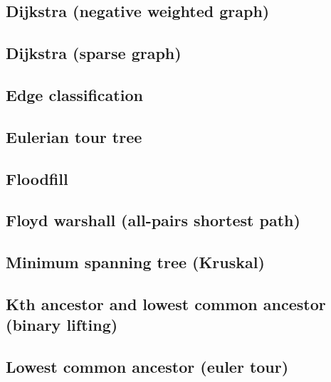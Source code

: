 \subsection{Dijkstra (negative weighted graph)}
\raggedbottom
\hrulefill
\subsection{Dijkstra (sparse graph)}
\raggedbottom
\hrulefill
\subsection{Edge classification}
\raggedbottom
\hrulefill
\subsection{Eulerian tour tree}
\raggedbottom
\hrulefill
\subsection{Floodfill}
\raggedbottom
\hrulefill
\subsection{Floyd warshall (all-pairs shortest path)}
\raggedbottom
\hrulefill
\subsection{Minimum spanning tree (Kruskal)}
\raggedbottom
\hrulefill
\subsection{Kth ancestor and lowest common ancestor (binary lifting)}
\raggedbottom
\hrulefill
\subsection{Lowest common ancestor (euler tour)}
\raggedbottom
\hrulefill

